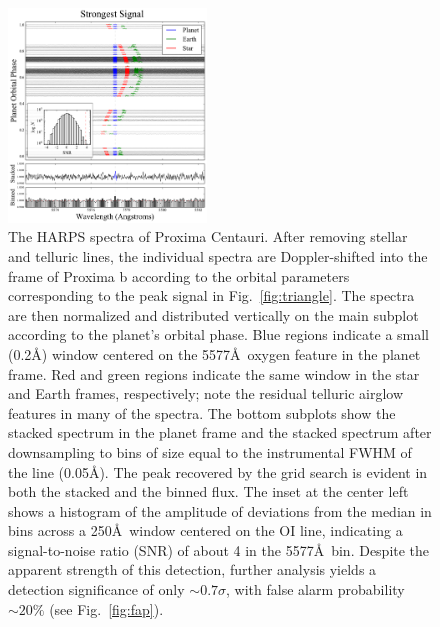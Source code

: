 \documentclass{emulateapj}
\begin{document}
\begin{figure}[bt]
\includegraphics[width=0.47\textwidth]{5577_strongest_river.pdf}
\caption{The HARPS spectra of Proxima Centauri. After removing stellar and telluric lines, the individual spectra are Doppler-shifted into the frame of Proxima b according to the orbital parameters corresponding to the peak signal in Fig.~\ref{fig:triangle}. The spectra are then normalized and distributed vertically on the main subplot according to the planet's orbital phase. Blue regions indicate a small (0.2\AA) window centered on the 5577\AA\ oxygen feature in the planet frame. Red and green regions indicate the same window in the star and Earth frames, respectively; note the residual telluric airglow features in many of the spectra. The bottom subplots show the stacked spectrum in the planet frame and the stacked spectrum after downsampling to bins of size equal to the instrumental FWHM of the line (0.05\AA). The peak recovered by the grid search is evident in both the stacked and the binned flux. The inset at the center left shows a histogram of the amplitude of deviations from the median in bins across a 250\AA\ window centered on the OI line, indicating a signal-to-noise ratio (SNR) of about 4 in the 5577\AA\ bin. Despite the apparent strength of this detection, further analysis yields a detection significance of only ${\sim} 0.7\sigma$, with false alarm probability ${\sim} 20\%$ (see Fig.~\ref{fig:fap}).}
\label{fig:strongest_river}
\end{figure}
\end{document}

